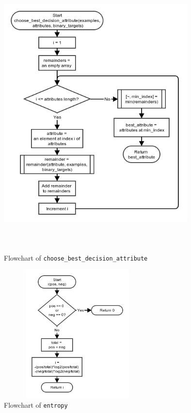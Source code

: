 \documentclass[10pt,a4paper]{article}
\begin{document}
\begin{figure}[!ht]
	\centering
	\includegraphics[height=15cm, width=10cm]{images/flow_chart/choose_best_decision_attribute.png}
	\caption{Flowchart of \tt{choose\_best\_decision\_attribute}}
	\label{fig:choose_best_decision_attribute}
\end{figure}

\begin{figure}[!ht]
	\centering
	\includegraphics[height=7cm, width=8cm]{images/flow_chart/entropy.png}
	\caption{Flowchart of \tt{entropy}}
	\label{fig:entropy}
\end{figure}
\end{document}

